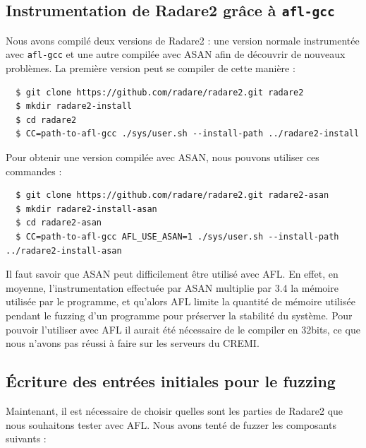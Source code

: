 \subsection{Instrumentation de Radare2 grâce à \lstinline{afl-gcc}}

Nous avons compilé deux versions de Radare2 : une version normale instrumentée avec \lstinline{afl-gcc} et une autre compilée avec ASAN afin de découvrir de nouveaux problèmes.
La première version peut se compiler de cette manière :

\begin{lstlisting}
  $ git clone https://github.com/radare/radare2.git radare2
  $ mkdir radare2-install
  $ cd radare2
  $ CC=path-to-afl-gcc ./sys/user.sh --install-path ../radare2-install
\end{lstlisting}

Pour obtenir une version compilée avec ASAN, nous pouvons utiliser ces commandes :

\begin{lstlisting}
  $ git clone https://github.com/radare/radare2.git radare2-asan
  $ mkdir radare2-install-asan
  $ cd radare2-asan
  $ CC=path-to-afl-gcc AFL_USE_ASAN=1 ./sys/user.sh --install-path ../radare2-install-asan
\end{lstlisting}

Il faut savoir que ASAN peut difficilement être utilisé avec AFL.
En effet, en moyenne, l'instrumentation effectuée par ASAN multiplie par 3.4 la mémoire utilisée par le programme\cite{asan}, et qu'alors AFL limite la quantité de mémoire utilisée pendant le fuzzing d'un programme pour préserver la stabilité du système.
Pour pouvoir l'utiliser avec AFL il aurait été nécessaire de le compiler en 32bits, ce que nous n'avons pas réussi à faire sur les serveurs du CREMI.

\subsection{Écriture des entrées initiales pour le fuzzing}

Maintenant, il est nécessaire de choisir quelles sont les parties de Radare2 que nous souhaitons tester avec AFL.
Nous avons tenté de fuzzer les composants suivants :

